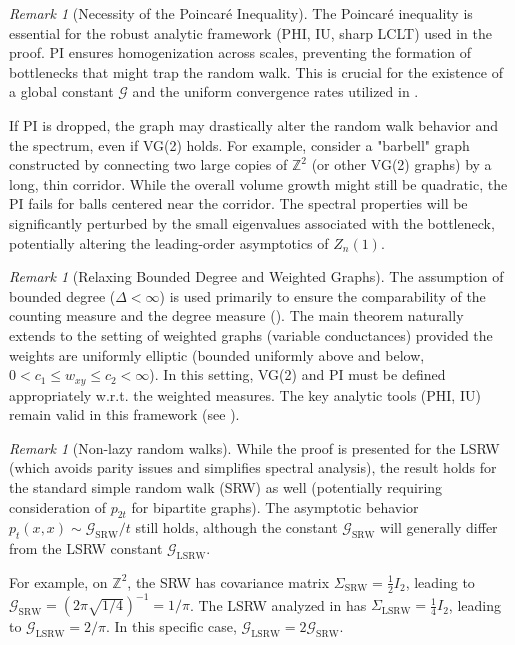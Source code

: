 \documentclass[12pt]{amsart}
\theoremstyle{definition}
\theoremstyle{remark}
\newtheorem{remark}[theorem]{Remark}
\newcommand{\cG}{\mathcal{G}}    %
\begin{document}
\begin{remark}[Necessity of the Poincaré Inequality]
The Poincaré inequality is essential for the robust analytic framework (PHI, IU, sharp LCLT) used in the proof. PI ensures homogenization across scales, preventing the formation of bottlenecks that might trap the random walk. This is crucial for the existence of a global constant $\cG$ and the uniform convergence rates utilized in .

If PI is dropped, the graph may drastically alter the random walk behavior and the spectrum, even if VG(2) holds. For example, consider a "barbell" graph constructed by connecting two large copies of $\mathbb{Z}^2$ (or other VG(2) graphs) by a long, thin corridor. While the overall volume growth might still be quadratic, the PI fails for balls centered near the corridor. The spectral properties will be significantly perturbed by the small eigenvalues associated with the bottleneck, potentially altering the leading-order asymptotics of $Z_n(1)$.
\end{remark}

\begin{remark}[Relaxing Bounded Degree and Weighted Graphs]
The assumption of bounded degree ($\Delta < \infty$) is used primarily to ensure the comparability of the counting measure and the degree measure (). The main theorem naturally extends to the setting of weighted graphs (variable conductances) provided the weights are uniformly elliptic (bounded uniformly above and below, $0 < c_1 \leq w_{xy} \leq c_2 < \infty$). In this setting, VG(2) and PI must be defined appropriately w.r.t. the weighted measures. The key analytic tools (PHI, IU) remain valid in this framework (see \cite{Delmotte99}).
\end{remark}

\begin{remark}[Non-lazy random walks]\label{rem:non-lazy}
While the proof is presented for the LSRW (which avoids parity issues and simplifies spectral analysis), the result holds for the standard simple random walk (SRW) as well (potentially requiring consideration of $p_{2t}$ for bipartite graphs). The asymptotic behavior $p_t(x,x) \sim \cG_{\text{SRW}}/t$ still holds, although the constant $\cG_{\text{SRW}}$ will generally differ from the LSRW constant $\cG_{\text{LSRW}}$.

For example, on $\mathbb{Z}^2$, the SRW has covariance matrix $\Sigma_{\text{SRW}} = \frac{1}{2} I_2$, leading to $\cG_{\text{SRW}} = (2\pi\sqrt{1/4})^{-1} = 1/\pi$. The LSRW analyzed in  has $\Sigma_{\text{LSRW}} = \frac{1}{4} I_2$, leading to $\cG_{\text{LSRW}} = 2/\pi$. In this specific case, $\cG_{\text{LSRW}}=2\cG_{\text{SRW}}$.
\end{remark}
\end{document}
